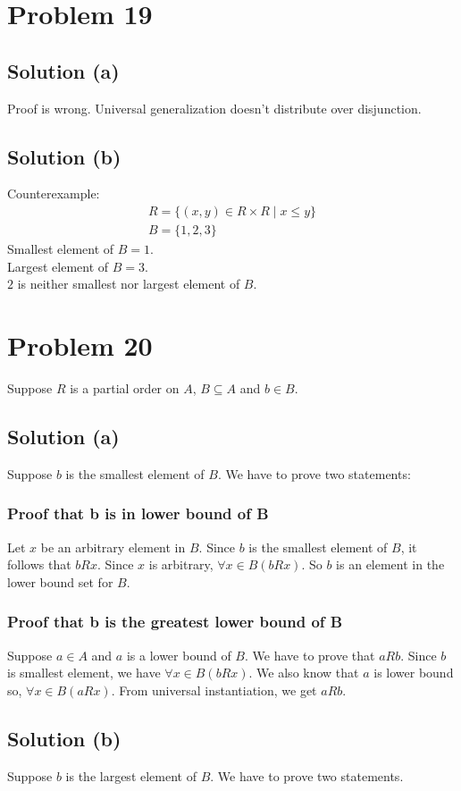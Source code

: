 \documentclass{article}
\begin{document}
\section{Problem 19}
\subsection{Solution (a)}
Proof is wrong. Universal generalization doesn't distribute over
disjunction.

\subsection{Solution (b)}
Counterexample:
\begin{align*}
  R = \{(x,y) \in R \times R \mid x \leq y\} \\
  B = \{1,2,3\}
\end{align*}
Smallest element of $B = 1$. \\
Largest element of $B = 3$. \\
$2$ is neither smallest nor largest element of $B$.

\section{Problem 20}
Suppose $R$ is a partial order on $A$, $B \subseteq A$ and $b \in B$.
\subsection{Solution (a)}
Suppose $b$ is the smallest element of $B$. We have to prove two
statements:
\subsubsection{Proof that b is in lower bound of B}
Let $x$ be an arbitrary element in $B$. Since $b$ is the smallest
element of $B$, it follows that $bRx$. Since $x$ is arbitrary,
$\forall x \in B(bRx)$. So $b$ is an element in the lower bound set
for $B$.
\subsubsection{Proof that b is the greatest lower bound of B}
Suppose $a \in A$ and $a$ is a lower bound of $B$. We have to prove
that $aRb$. Since $b$ is smallest element, we have $\forall x \in
B(bRx)$. We also know that $a$ is lower bound so, $\forall x \in
B(aRx)$. From universal instantiation, we get $aRb$.

\subsection{Solution (b)}
Suppose $b$ is the largest element of $B$. We have to prove two
statements.
\end{document}
